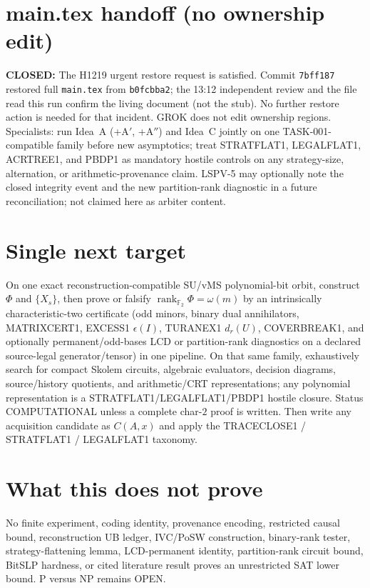 \documentclass[11pt]{article}
\begin{document}
\section*{main.tex handoff (no ownership edit)}
\textbf{CLOSED:} The H1219 urgent restore request is satisfied. Commit \texttt{7bff187}
restored full \texttt{main.tex} from \texttt{b0fcbba2}; the 13:12 independent review and the
file read this run confirm the living document (not the stub). No further restore action is
needed for that incident. GROK does not edit ownership regions.
Specialists: run Idea~A (+A$'$, +A$''$) and Idea~C jointly on one TASK-001-compatible family
before new asymptotics; treat STRATFLAT1, LEGALFLAT1, ACRTREE1, and PBDP1 as mandatory
hostile controls on any strategy-size, alternation, or arithmetic-provenance claim.
LSPV-5 may optionally note the closed integrity event and the new partition-rank diagnostic
in a future reconciliation; not claimed here as arbiter content.

\section*{Single next target}
On one exact reconstruction-compatible SU/vMS polynomial-bit orbit, construct $\Phi$ and
$\{X_s\}$, then prove or falsify $\operatorname{rank}_{\mathbb F_2}\Phi=\omega(m)$ by an
intrinsically characteristic-two certificate (odd minors, binary dual annihilators,
MATRIXCERT1, EXCESS1 $\epsilon(I)$, TURANEX1 $d_r(U)$, COVERBREAK1, and optionally
permanent/odd-bases LCD or partition-rank diagnostics on a declared source-legal generator/tensor)
in one pipeline.
On that same family, exhaustively search for compact Skolem circuits, algebraic evaluators,
decision diagrams, source/history quotients, and arithmetic/CRT representations; any
polynomial representation is a STRATFLAT1/LEGALFLAT1/PBDP1 hostile closure.
Status COMPUTATIONAL unless a complete char-$2$ proof is written. Then write any acquisition
candidate as $C(A,x)$ and apply the TRACECLOSE1 / STRATFLAT1 / LEGALFLAT1 taxonomy.

\section*{What this does not prove}
No finite experiment, coding identity, provenance encoding, restricted causal bound,
reconstruction UB ledger, IVC/PoSW construction, binary-rank tester, strategy-flattening lemma,
LCD-permanent identity, partition-rank circuit bound, BitSLP hardness, or cited literature
result proves an unrestricted SAT lower bound. P versus NP remains OPEN.
\end{document}
